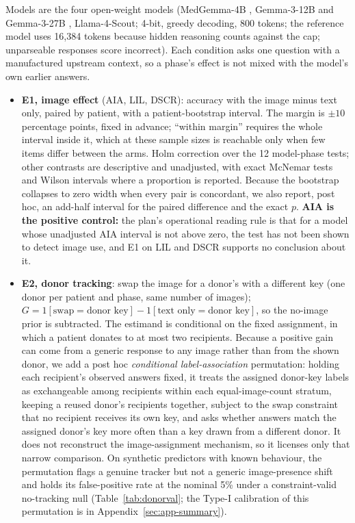 \documentclass[11pt]{article}
\begin{document}
Models are the four open-weight models (MedGemma-4B \citep{sellergren2025medgemma}, Gemma-3-12B and Gemma-3-27B \citep{gemmateam2025gemma3}, Llama-4-Scout; 4-bit, greedy decoding, 800 tokens; the reference model uses 16{,}384 tokens because hidden reasoning counts against the cap; unparseable responses score incorrect). Each condition asks one question with a manufactured upstream context, so a phase's effect is not mixed with the model's own earlier answers.

\begin{itemize}[leftmargin=*, itemsep=1pt, topsep=2pt]
    \item \textbf{E1, image effect} (AIA, LIL, DSCR): accuracy with the image minus text only, paired by patient, with a patient-bootstrap interval. The margin is $\pm10$ percentage points, fixed in advance; ``within margin'' requires the whole interval inside it, which at these sample sizes is reachable only when few items differ between the arms. Holm correction over the 12 model-phase tests; other contrasts are descriptive and unadjusted, with exact McNemar tests \citep{mcnemar1947note} and Wilson intervals \citep{wilson1927probable} where a proportion is reported. Because the bootstrap collapses to zero width when every pair is concordant, we also report, post hoc, an add-half interval for the paired difference \citep{agresti2005simple} and the exact $p$. \textbf{AIA is the positive control:} the plan's operational reading rule is that for a model whose unadjusted AIA interval is not above zero, the test has not been shown to detect image use, and E1 on LIL and DSCR supports no conclusion about it.
    \item \textbf{E2, donor tracking}: swap the image for a donor's with a different key (one donor per patient and phase, same number of images); $G=1[\text{swap}=\text{donor key}]-1[\text{text only}=\text{donor key}]$, so the no-image prior is subtracted. The estimand is conditional on the fixed assignment, in which a patient donates to at most two recipients. Because a positive gain can come from a generic response to any image rather than from the shown donor, we add a post hoc \emph{conditional label-association} permutation: holding each recipient's observed answers fixed, it treats the assigned donor-key labels as exchangeable among recipients within each equal-image-count stratum, keeping a reused donor's recipients together, subject to the swap constraint that no recipient receives its own key, and asks whether answers match the assigned donor's key more often than a key drawn from a different donor. It does not reconstruct the image-assignment mechanism, so it licenses only that narrow comparison. On synthetic predictors with known behaviour, the permutation flags a genuine tracker but not a generic image-presence shift and holds its false-positive rate at the nominal 5\% under a constraint-valid no-tracking null (Table~\ref{tab:donorval}; the Type-I calibration of this permutation is in Appendix~\ref{sec:app-summary}).

\end{itemize}
\end{document}
